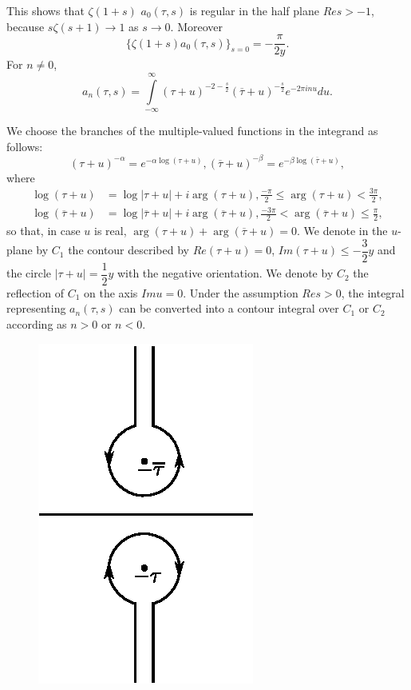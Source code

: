 This shows that $\zeta(1+s)$ $a_0(\tau,s)$ is regular in the half plane
$Re s > -1$, because $s\zeta(s+1)\to 1$ as $s\to 0$. Moreover
$$
\{\zeta(1+s) a_0(\tau, s)\}_{s=0} = - \frac{\pi}{2y}.
$$
For $n\neq 0$,
$$
a_n(\tau, s) = \int\limits^{\infty}_{-\infty}
(\tau+u)^{-2-\frac{s}{2}} (\overline{\tau}+u)^{-\frac{s}{2}} e^{-2\pi
  i nu} du.
$$

We choose the branches of the multiple-valued functions in the
integrand as follows:
$$
(\tau+u)^{-\alpha} = e^{-\alpha \log (\tau+u)},
(\overline{\tau}+u)^{-\beta} =e^{-\beta\log(\overline{\tau}+u)},
$$
where \pageoriginale
\begin{align*}
\log(\tau+u) & = \log |\tau+u| +i \arg(\tau+u), \frac{-\pi}{2} \leq
\arg(\tau+u) < \frac{3\pi}{2},\\
\log (\overline{\tau}+u) & = \log |\overline{\tau}+u| + i
\arg(\overline{\tau}+u), \frac{-3\pi}{2} < \arg (\overline{\tau}+u)
\leq \frac{\pi}{2},
\end{align*}
so that, in case $u$ is real,
$\arg(\tau+u)+\arg(\overline{\tau}+u)=0$. We denote in the $u$-plane
by $C_1$ the contour described by $Re(\tau+u)=0$, $Im(\tau+u) \leq
-\dfrac{3}{2}y$ and the circle $|\tau+u|=\dfrac{1}{2}y$ with the
negative orientation. We denote by $C_2$ the reflection of $C_1$ on
the axis $Im u=0$. Under the assumption $Re s>0$, the integral
representing $a_n(\tau, s)$ can be converted into a contour integral
over $C_1$ or $C_2$ according as $n>0$ or $n<0$.
\begin{figure}[H]
\centering
\includegraphics{vol29-fig/fig29-20.eps}
\end{figure}

